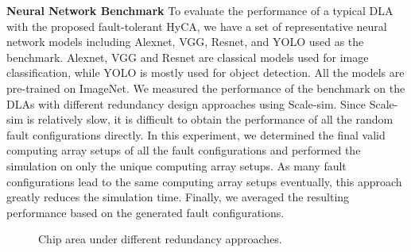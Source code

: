 \textbf{Neural Network Benchmark} To evaluate the performance of a typical DLA with the proposed fault-tolerant HyCA, we have a set of representative neural network models including Alexnet, VGG, Resnet, and YOLO used as the benchmark. Alexnet, VGG and Resnet are classical models used for image classification, while YOLO is mostly used for object detection. All the models are pre-trained on ImageNet. We measured the performance of the benchmark on the DLAs with different redundancy design approaches using Scale-sim\cite{samajdar2018scale}. Since Scale-sim is relatively slow, it is difficult to obtain the performance of all the random fault configurations directly. In this experiment, we determined the final valid computing array setups of all the fault configurations and performed the simulation on only the unique computing array setups. As many fault configurations lead to the same computing array setups eventually, this approach greatly reduces the simulation time. Finally, we averaged the resulting performance based on the generated fault configurations.

\begin{figure}
\setlength{\abovecaptionskip}{-2pt}
\setlength{\belowcaptionskip}{0pt}
    \caption{Chip area under different redundancy approaches.}
\label{Circuit area}
\vspace{-1em}
\end{figure}

